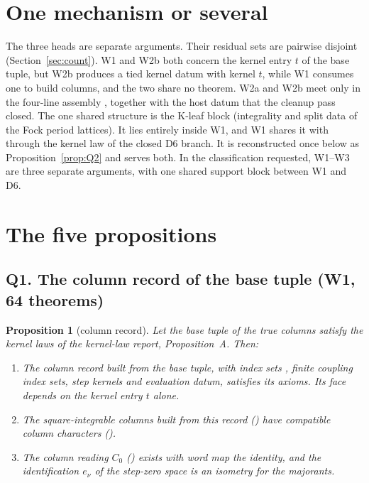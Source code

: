 \documentclass[11pt]{article}
\newtheorem{proposition}[theorem]{Proposition}
\theoremstyle{remark}
\begin{document}
\section{One mechanism or several}\label{sec:common}

The three heads are separate arguments. Their residual sets are pairwise disjoint (Section~\ref{sec:count}). W1 and W2b both concern the kernel entry $t$ of the base tuple, but W2b produces a tied kernel datum with kernel $t$, while W1 consumes one to build columns, and the two share no theorem. W2a and W2b meet only in the four-line assembly , together with the host datum that the cleanup pass closed. The one shared structure is the K-leaf block (integrality and split data of the Fock period lattices). It lies entirely inside W1, and W1 shares it with  through the kernel law of the closed D6 branch. It is reconstructed once below as Proposition~\ref{prop:Q2} and serves both. In the classification requested, W1--W3 are three separate arguments, with one shared support block between W1 and D6.

\section{The five propositions}\label{sec:props}

\subsection{Q1. The column record of the base tuple (W1, 64 theorems)}

\begin{proposition}[column record]\label{prop:Q1}
Let the base tuple of the true columns satisfy the kernel laws of the kernel-law report, Proposition~A. Then:
\begin{enumerate}[label=(\roman*),itemsep=1pt]
\item The column record  built from the base tuple, with index sets , finite coupling index sets, step kernels and evaluation datum, satisfies its axioms. Its face depends on the kernel entry $t$ alone.
\item The square-integrable columns built from this record () have compatible column characters ().
\item The column reading $C_0$ () exists with word map the identity, and the identification $e_\nu$ of the step-zero space is an isometry for the majorants.
\end{enumerate}
\end{proposition}
\end{document}
